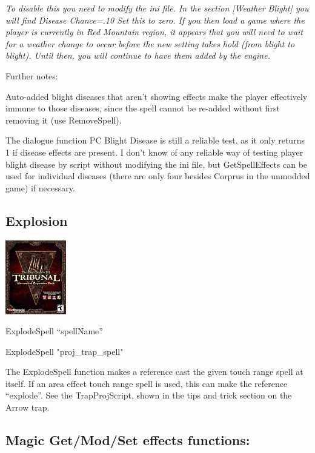 \emph{To disable this you need to modify the ini file. In the section
{[}Weather Blight{]} you will find Disease Chance=.10 Set this to zero.
If you then load a game where the player is currently in Red Mountain
region, it appears that you will need to wait for a weather change to
occur before the new setting takes hold (from blight to blight). Until
then, you will continue to have them added by the engine.}

Further notes:

Auto-added blight diseases that aren't showing effects make the player
effectively immune to those diseases, since the spell cannot be re-added
without first removing it (use RemoveSpell).

The dialogue function PC Blight Disease is still a reliable test, as it
only returns 1 if disease effects are present. I don't know of any
reliable way of testing player blight disease by script without
modifying the ini file, but GetSpellEffects can be used for individual
diseases (there are only four besides Corprus in the unmodded game) if
necessary.

\hypertarget{explosion}{%
\subsection{Explosion}\label{explosion}}

\includegraphics{media/image6.png}

ExplodeSpell ``spellName''

ExplodeSpell "proj\_trap\_spell"

The ExplodeSpell function makes a reference cast the given touch range
spell at itself. If an area effect touch range spell is used, this can
make the reference ``explode''. See the TrapProjScript, shown in the
tips and trick section on the Arrow trap.

\hypertarget{magic-getmodset-effects-functions}{%
\subsection{Magic Get/Mod/Set effects
functions:}\label{magic-getmodset-effects-functions}}

